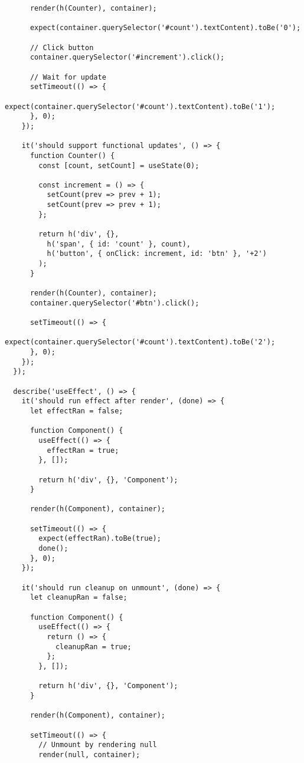 \documentclass[11pt]{article}
\begin{document}
\begin{verbatim}
      render(h(Counter), container);
      
      expect(container.querySelector('#count').textContent).toBe('0');
      
      // Click button
      container.querySelector('#increment').click();
      
      // Wait for update
      setTimeout(() => {
        expect(container.querySelector('#count').textContent).toBe('1');
      }, 0);
    });
    
    it('should support functional updates', () => {
      function Counter() {
        const [count, setCount] = useState(0);
        
        const increment = () => {
          setCount(prev => prev + 1);
          setCount(prev => prev + 1);
        };
        
        return h('div', {},
          h('span', { id: 'count' }, count),
          h('button', { onClick: increment, id: 'btn' }, '+2')
        );
      }
      
      render(h(Counter), container);
      container.querySelector('#btn').click();
      
      setTimeout(() => {
        expect(container.querySelector('#count').textContent).toBe('2');
      }, 0);
    });
  });
  
  describe('useEffect', () => {
    it('should run effect after render', (done) => {
      let effectRan = false;
      
      function Component() {
        useEffect(() => {
          effectRan = true;
        }, []);
        
        return h('div', {}, 'Component');
      }
      
      render(h(Component), container);
      
      setTimeout(() => {
        expect(effectRan).toBe(true);
        done();
      }, 0);
    });
    
    it('should run cleanup on unmount', (done) => {
      let cleanupRan = false;
      
      function Component() {
        useEffect(() => {
          return () => {
            cleanupRan = true;
          };
        }, []);
        
        return h('div', {}, 'Component');
      }
      
      render(h(Component), container);
      
      setTimeout(() => {
        // Unmount by rendering null
        render(null, container);
        

\end{verbatim}
\end{document}
